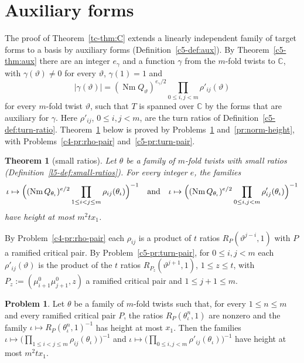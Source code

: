 \documentclass[reqno]{amsart}
\theoremstyle{definition}
\newtheorem{problem}{Problem}[section]
\theoremstyle{plain}
\newtheorem{theorem}{Theorem}[section]
\newcommand{\C}{\mathbb C}
\newcommand{\Nm}{\operatorname{Nm}}
\begin{document}
\section{Auxiliary forms}\label{sec:aux}

The proof of Theorem~\ref{tc-thm:C} extends a linearly independent family of target forms to a basis by auxiliary forms (Definition~\ref{c5-def:aux}).  By Theorem~\ref{c5-thm:aux} there are an integer \(e_\gamma\) and a function \(\gamma\) from the \(m\)-fold twists to \(\C\), with \(\gamma(\vartheta) \ne 0\) for every \(\vartheta\), \(\gamma(1) = 1\) and
\[
  \lvert\gamma(\vartheta)\rvert = (\Nm Q_\vartheta)^{e_\gamma/2} \prod_{0 \le i, j < m} \rho'_{ij}(\vartheta)
\]
for every \(m\)-fold twist \(\vartheta\), such that \(T\) is spanned over \(\C\) by the forms that are auxiliary for \(\gamma\).  Here \(\rho'_{ij}\), \(0 \le i, j < m\), are the turn ratios of Definition~\ref{c5-def:turn-ratio}.  Theorem~\ref{thm:small-ratios} below is proved by Problems~\ref{pr:count-ratios} and~\ref{pr:norm-height}, with Problems~\ref{c4-pr:rho-pair} and~\ref{c5-pr:turn-pair}.

\begin{theorem}[small ratios]\label{thm:small-ratios}
Let \(\theta\) be a family of \(m\)-fold twists with small ratios (Definition~\ref{l5-def:small-ratios}).  For every integer \(e\), the families
\[
  \iota \mapsto \Bigl((\Nm Q_{\theta_\iota})^{e/2}\prod_{1 \le i < j \le m}\rho_{ij}(\theta_\iota)\Bigr)^{-1}
  \quad\text{and}\quad
  \iota \mapsto \Bigl((\Nm Q_{\theta_\iota})^{e/2}\prod_{0 \le i, j < m}\rho'_{ij}(\theta_\iota)\Bigr)^{-1}
\]
have height at most \(m^2tx_1\).
\end{theorem}

By Problem~\ref{c4-pr:rho-pair} each \(\rho_{ij}\) is a product of \(t\) ratios \(R_P(\vartheta^{j-i}, 1)\) with \(P\) a ramified critical pair.  By Problem~\ref{c5-pr:turn-pair}, for \(0 \le i, j < m\) each \(\rho'_{ij}(\vartheta)\) is the product of the \(t\) ratios \(R_{P_z}(\vartheta^{j+1}, 1)\), \(1 \le z \le t\), with \(P_z := (\mu^0_{i+1}\mu^0_{j+1}, z)\) a ramified critical pair and \(1 \le j + 1 \le m\).

\begin{problem}\label{pr:count-ratios}
Let \(\theta\) be a family of \(m\)-fold twists such that, for every \(1 \le n \le m\) and every ramified critical pair \(P\), the ratios \(R_P(\theta_\iota^n, 1)\) are nonzero and the family \(\iota \mapsto R_P(\theta_\iota^n, 1)^{-1}\) has height at most \(x_1\).  Then the families \(\iota \mapsto \bigl(\prod_{1 \le i < j \le m}\rho_{ij}(\theta_\iota)\bigr)^{-1}\) and \(\iota \mapsto \bigl(\prod_{0 \le i, j < m}\rho'_{ij}(\theta_\iota)\bigr)^{-1}\) have height at most \(m^2tx_1\).
\end{problem}
\end{document}
